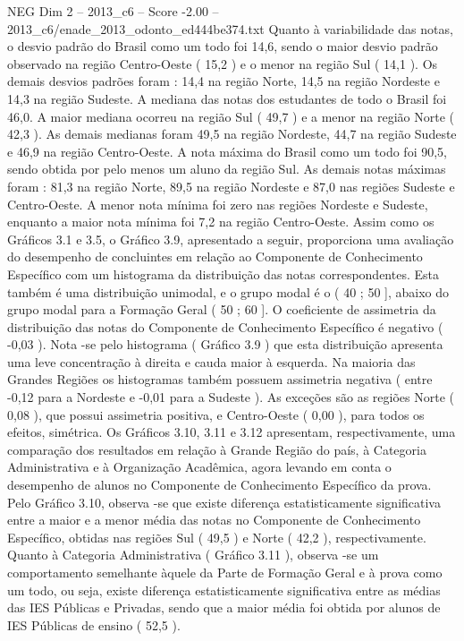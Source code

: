 \begin{textsample}{NEG Dim 2 – 2013\_c6 – Score -2.00 – 2013\_c6/enade\_2013\_odonto\_ed444be374.txt}
Quanto à variabilidade das notas, o desvio padrão do Brasil como um todo foi 14,6, sendo o maior desvio padrão observado na região Centro-Oeste ( 15,2 ) e o menor na região Sul ( 14,1 ).
Os demais desvios padrões foram : 14,4 na região Norte, 14,5 na região Nordeste e 14,3 na região Sudeste.
A mediana das notas dos estudantes de todo o Brasil foi 46,0.
A maior mediana ocorreu na região Sul ( 49,7 ) e a menor na região Norte ( 42,3 ).
As demais medianas foram 49,5 na região Nordeste, 44,7 na região Sudeste e 46,9 na região Centro-Oeste.
A nota máxima do Brasil como um todo foi 90,5, sendo obtida por pelo menos um aluno da região Sul.
As demais notas máximas foram : 81,3 na região Norte, 89,5 na região Nordeste e 87,0 nas regiões Sudeste e Centro-Oeste.
A menor nota mínima foi zero nas regiões Nordeste e Sudeste, enquanto a maior nota mínima foi 7,2 na região Centro-Oeste.
Assim como os Gráficos 3.1 e 3.5, o Gráfico 3.9, apresentado a seguir, proporciona uma avaliação do desempenho de concluintes em relação ao Componente de Conhecimento Específico com um histograma da distribuição das notas correspondentes.
Esta também é uma distribuição unimodal, e o grupo modal é o ( 40 ; 50 ], abaixo do grupo modal para a Formação Geral ( 50 ; 60 ].
O coeficiente de assimetria da distribuição das notas do Componente de Conhecimento Específico é negativo ( -0,03 ).
Nota -se pelo histograma ( Gráfico 3.9 ) que esta distribuição apresenta uma leve concentração à direita e cauda maior à esquerda.
Na maioria das Grandes Regiões os histogramas também possuem assimetria negativa ( entre -0,12 para a Nordeste e -0,01 para a Sudeste ).
As exceções são as regiões Norte ( 0,08 ), que possui assimetria positiva, e Centro-Oeste ( 0,00 ), para todos os efeitos, simétrica.
Os Gráficos 3.10, 3.11 e 3.12 apresentam, respectivamente, uma comparação dos resultados em relação à Grande Região do país, à Categoria Administrativa e à Organização Acadêmica, agora levando em conta o desempenho de alunos no Componente de Conhecimento Específico da prova.
Pelo Gráfico 3.10, observa -se que existe diferença estatisticamente significativa entre a maior e a menor média das notas no Componente de Conhecimento Específico, obtidas nas regiões Sul ( 49,5 ) e Norte ( 42,2 ), respectivamente.
Quanto à Categoria Administrativa ( Gráfico 3.11 ), observa -se um comportamento semelhante àquele da Parte de Formação Geral e à prova como um todo, ou seja, existe diferença estatisticamente significativa entre as médias das IES Públicas e Privadas, sendo que a maior média foi obtida por alunos de IES Públicas de ensino ( 52,5 ).

\end{textsample}
